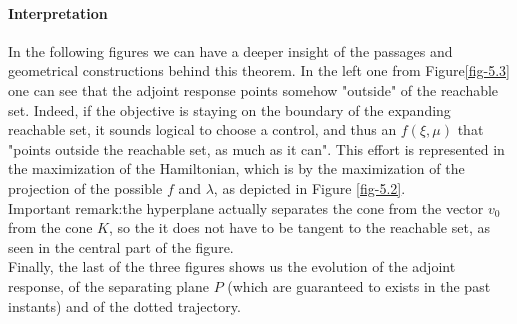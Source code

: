\paragraph{Interpretation}
In the following figures we can have a deeper insight of the passages and geometrical constructions behind this theorem. In the left one from Figure\ref{fig-5.3} one can see that the adjoint response points somehow "outside" of the reachable set. Indeed, if the objective is staying on the boundary of the expanding reachable set, it sounds logical to choose a control, and thus an $f(\xi,\mu)$ that "points outside the reachable set, as much as it can". This effort is represented in the maximization of the Hamiltonian,  which is by the maximization of the projection of the possible $f$ and $\lambda$, as depicted in Figure \ref{fig-5.2}. \\
Important remark:the hyperplane actually separates the cone from the vector $v_0$ from the cone $K$, so the it does not have to be tangent to the reachable set, as seen in the central part of the figure.\\
Finally, the last of the three figures shows us the evolution of the adjoint response, of the separating plane $P$ (which are guaranteed to exists in the past instants) and of the dotted trajectory.


